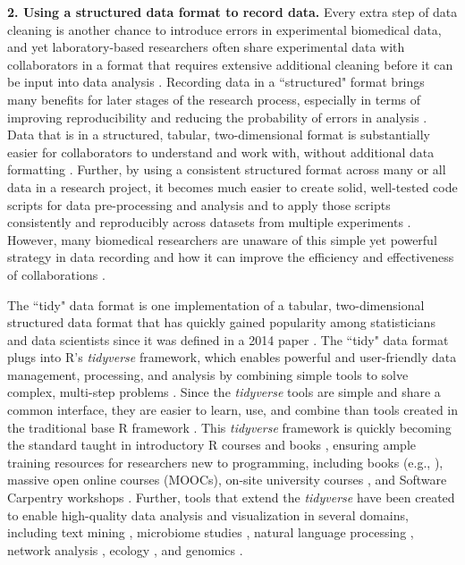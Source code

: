 \documentclass[pdftex,english,11.5pt,parskip=half]{scrartcl}
\begin{document}
\textbf{2. Using a structured data format to record data.} Every extra step of data
cleaning is another chance to introduce errors in experimental biomedical data, and yet laboratory-based researchers often share experimental data with collaborators in a format that requires extensive additional cleaning before it can be input into data analysis \cite{broman2018data}. Recording data in a ``structured" format brings many benefits for later stages of the research process, especially in terms of improving reproducibility and reducing the probability of errors in analysis \cite{ellis2018share}. Data that is in a structured, tabular, two-dimensional format is substantially easier for collaborators to understand and work with, without additional data formatting \cite{broman2018data}. Further, by using a consistent structured format across many or all data in a research project, it becomes much easier to create solid, well-tested code scripts for data pre-processing and analysis and to apply those scripts consistently and reproducibly across datasets from multiple experiments \cite{broman2018data}. However, many biomedical researchers are unaware of this simple yet powerful strategy in data recording and how it can improve the efficiency and effectiveness of collaborations \cite{ellis2018share}. 

The ``tidy" data format is one implementation of a tabular, two-dimensional structured data format that has quickly gained popularity among statisticians and data scientists since it was defined in a 2014 paper \cite{wickham2014tidy}. The ``tidy" data
format plugs into R's \textit{tidyverse} framework, which enables powerful and
user-friendly data management, processing, and analysis by combining simple
tools to solve complex, multi-step problems
\cite{ross2017declutter, silge2016tidytext, wickham2016ggplot2, wickham2016r}. Since the \textit{tidyverse} tools are simple and share a
common interface, they are easier to learn, use, and combine than tools created
in the traditional base R framework \cite{ross2017declutter, lowndes2017our,
reviewer2017review, mcnamara2016state}. This \textit{tidyverse} framework is
quickly becoming the standard taught in introductory R courses and books
\cite{hicks2017guide, baumer2015data, kaplan2018teaching, stander2017enthusing,
reviewer2017review, mcnamara2016state}, ensuring ample training resources for
researchers new to programming, including books (e.g., \cite{baumer2017modern,
lifesciencesR, wickham2016r}),
massive open online courses (MOOCs), on-site university courses
\cite{baumer2015data, kaplan2018teaching, stander2017enthusing}, and Software
Carpentry workshops \cite{wilson2014software, pawlik2017developing}. Further,
tools that extend the \textit{tidyverse} have been created to enable high-quality data
analysis and visualization in several domains, including text mining
\cite{silge2017text}, microbiome studies \cite{mcmurdie2013phyloseq}, natural
language processing \cite{RJ-2017-035}, network analysis \cite{RJ-2017-023},
ecology \cite{hsieh2016inext}, and genomics \cite{yin2012ggbio}. 
\end{document}
